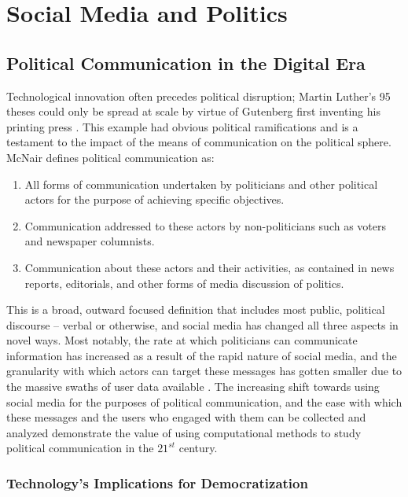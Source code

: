 \chapter{Social Media and Politics}\label{ch:SMandPolitics}

\section{Political Communication in the Digital Era}

Technological innovation often precedes political disruption; Martin Luther’s 95
theses could only be spread at scale by virtue of Gutenberg first inventing his
printing press \cite{gardels2019renovating}. This example had obvious political
ramifications and is a testament to the impact of the means of communication on
the political sphere. McNair defines political communication as:

\begin{enumerate}    
    \item All forms of communication undertaken by politicians and other
    political actors for the purpose of achieving specific objectives.
    \item Communication addressed to these actors by non-politicians such as
    voters and newspaper columnists.
    \item Communication about these actors and their activities, as contained in news reports, editorials, and other forms of media discussion of politics. \cite{mcnair2017introduction}
\end{enumerate} 

This is a broad, outward focused definition that includes most public, political
discourse -- verbal or otherwise, and social media has changed all three aspects
in novel ways. Most notably, the rate at which politicians can communicate
information has increased as a result of the rapid nature of social media, and
the granularity with which actors can target these messages has gotten
smaller due to the massive swaths of user data available
\cite{nickerson2014political}. The increasing shift towards using social media
for the purposes of political communication, and the ease with which these
messages and the users who engaged with them can be collected and analyzed
demonstrate the value of using computational methods to study political
communication in the $21^{st}$ century.

\subsection{Technology's Implications for Democratization}

